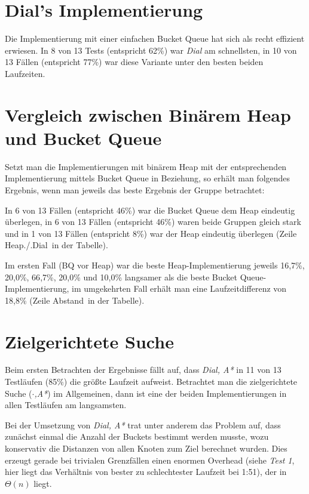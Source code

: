 \documentclass{scrartcl}
\begin{document}
\section{Dial's Implementierung}

Die Implementierung mit einer einfachen Bucket Queue hat sich als recht 
effizient erwiesen.
In 8 von 13 Tests (entspricht 62\%) war \emph{Dial} am schnellsten, in 
10 von 13 Fällen (entspricht 77\%) war diese Variante unter den besten
beiden Laufzeiten.

\section{Vergleich zwischen Binärem Heap und Bucket Queue}

Setzt man die Implementierungen mit binärem Heap mit der entsprechenden 
Implementierung mittels Bucket Queue  in Beziehung, so erhält man folgendes
Ergebnis, wenn man jeweils das beste Ergebnis der Gruppe betrachtet:

In 6 von 13 Fällen (entspricht 46\%) war die Bucket Queue dem Heap eindeutig überlegen,
in 6 von 13 Fällen (entspricht 46\%) waren beide Gruppen gleich stark und
in 1 von 13 Fällen (entspricht 8\%) war der Heap eindeutig überlegen
 (Zeile \glqq Heap./.Dial\grqq\ in der Tabelle).

Im ersten Fall (BQ vor Heap) war die beste Heap-Implementierung
jeweils 16{,}7\%, 20{,}0\%, 66{,}7\%, 20{,}0\% und 10{,}0\% langsamer als die beste
Bucket Queue-Implementierung, im umgekehrten Fall erhält 
man eine Laufzeitdifferenz von 18{,}8\% (Zeile \glqq Abstand\grqq\ in der Tabelle).

\section{Zielgerichtete Suche}

Beim ersten Betrachten der Ergebnisse fällt auf, dass \emph{Dial, A*} in
11 von 13 Testläufen (85\%) die größte Laufzeit aufweist.
Betrachtet man die zielgerichtete Suche (\emph{$\cdot$,A*}) im Allgemeinen,
dann ist eine der beiden Implementierungen in allen Testläufen am langsamsten.

Bei der Umsetzung von \emph{Dial, A*} trat unter anderem das Problem auf,
dass zunächst einmal die Anzahl der Buckets bestimmt werden musste, wozu
konservativ die Distanzen von allen Knoten zum Ziel berechnet wurden.
Dies erzeugt gerade bei trivialen Grenzfällen einen enormen Overhead
(siehe \emph{Test 1}, hier liegt das Verhältnis von bester zu 
schlechtester Laufzeit bei 1:51), der in $\Theta(n)$ liegt. 
\end{document}
